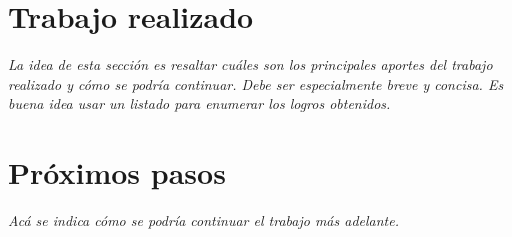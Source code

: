 
\section{Trabajo realizado}

\emph{La idea de esta sección es resaltar cuáles son los principales aportes del trabajo realizado y cómo se podría continuar. Debe ser especialmente breve y concisa. Es buena idea usar un listado para enumerar los logros obtenidos.}

\section{Próximos pasos}

\emph{Acá se indica cómo se podría continuar el trabajo más adelante.}
